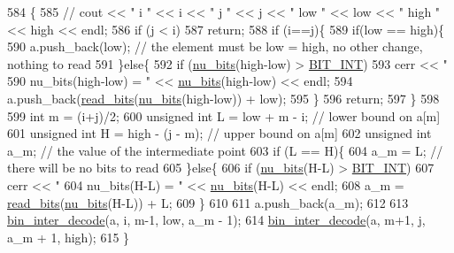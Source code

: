 \begin{DoxyCode}
584                                                                                 \{
585   \textcolor{comment}{// cout << " i " << i << " j " << j << " low " << low << " high " << high << endl;}
586   \textcolor{keywordflow}{if} (j < i)
587     \textcolor{keywordflow}{return};
588   \textcolor{keywordflow}{if} (i==j)\{
589     \textcolor{keywordflow}{if}(low == high)\{
590       a.push\_back(low); \textcolor{comment}{// the element must be low = high, no other change, nothing to read}
591     \}\textcolor{keywordflow}{else}\{
592       \textcolor{keywordflow}{if} (\hyperlink{bitstream_8cpp_a9dfce6f51e3febb3973aa3b16c2fecb4}{nu\_bits}(high-low) > \hyperlink{bitstream_8h_afcadf5aa65c5159bfb96c4d82ebc0a5d}{BIT\_INT})
593         cerr << \textcolor{stringliteral}{" 590 nu\_bits(high-low) = "} << \hyperlink{bitstream_8cpp_a9dfce6f51e3febb3973aa3b16c2fecb4}{nu\_bits}(high-low) << endl;
594       a.push\_back(\hyperlink{classibitstream_a2fdcaecf10fefa6942dcd5286a2696e0}{read\_bits}(\hyperlink{bitstream_8cpp_a9dfce6f51e3febb3973aa3b16c2fecb4}{nu\_bits}(high-low)) + low);
595     \}
596     \textcolor{keywordflow}{return};
597   \}
598 
599   \textcolor{keywordtype}{int} m = (i+j)/2;
600   \textcolor{keywordtype}{unsigned} \textcolor{keywordtype}{int} L = low + m - i; \textcolor{comment}{// lower bound on a[m]}
601   \textcolor{keywordtype}{unsigned} \textcolor{keywordtype}{int} H = high - (j - m); \textcolor{comment}{// upper bound on a[m]}
602   \textcolor{keywordtype}{unsigned} \textcolor{keywordtype}{int} a\_m; \textcolor{comment}{// the value of the intermediate point}
603   \textcolor{keywordflow}{if} (L == H)\{
604     a\_m = L; \textcolor{comment}{// there will be no bits to read}
605   \}\textcolor{keywordflow}{else}\{
606     \textcolor{keywordflow}{if} (\hyperlink{bitstream_8cpp_a9dfce6f51e3febb3973aa3b16c2fecb4}{nu\_bits}(H-L) > \hyperlink{bitstream_8h_afcadf5aa65c5159bfb96c4d82ebc0a5d}{BIT\_INT})
607       cerr << \textcolor{stringliteral}{" 604 nu\_bits(H-L) = "} << \hyperlink{bitstream_8cpp_a9dfce6f51e3febb3973aa3b16c2fecb4}{nu\_bits}(H-L) << endl;
608     a\_m = \hyperlink{classibitstream_a2fdcaecf10fefa6942dcd5286a2696e0}{read\_bits}(\hyperlink{bitstream_8cpp_a9dfce6f51e3febb3973aa3b16c2fecb4}{nu\_bits}(H-L)) + L;
609   \}
610   
611   a.push\_back(a\_m);
612 
613   \hyperlink{classibitstream_a4d1bfd02f98f6af2ac4d80034b23e26d}{bin\_inter\_decode}(a, i, m-1, low, a\_m - 1);
614   \hyperlink{classibitstream_a4d1bfd02f98f6af2ac4d80034b23e26d}{bin\_inter\_decode}(a, m+1, j, a\_m + 1, high);
615 \}
\end{DoxyCode}
\mbox{\label{classibitstream_aa7b59600e58571b802d6d0dadf92d37a}} 
